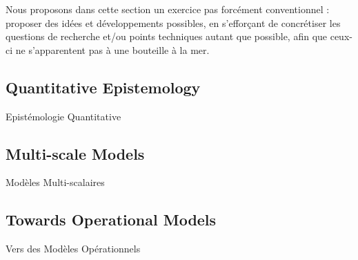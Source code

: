 Nous proposons dans cette section un exercice pas forcément conventionnel : proposer des idées et développements possibles, en s'efforçant de concrétiser les questions de recherche et/ou points techniques autant que possible, afin que ceux-ci ne s'apparentent pas à une bouteille à la mer.



\subsection*{Quantitative Epistemology}{Epistémologie Quantitative}

%



\subsection*{Multi-scale Models}{Modèles Multi-scalaires}





\subsection*{Towards Operational Models}{Vers des Modèles Opérationnels}


















